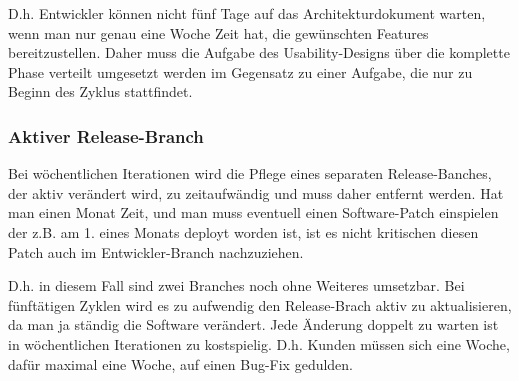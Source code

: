 D.h. Entwickler können nicht fünf Tage auf das Architekturdokument warten,
wenn man nur genau eine Woche Zeit hat, die gewünschten Features
bereitzustellen. Daher muss die Aufgabe des Usability-Designs über die
komplette Phase verteilt umgesetzt werden im Gegensatz zu einer Aufgabe, die
nur zu Beginn des Zyklus stattfindet.

\subsubsection{Aktiver Release-Branch}
Bei wöchentlichen Iterationen wird die Pflege eines separaten Release-Banches,
der aktiv verändert wird, zu zeitaufwändig und muss daher entfernt werden. Hat
man einen Monat Zeit, und man muss eventuell einen Software-Patch einspielen
der z.B. am 1. eines Monats deployt worden ist, ist es nicht kritischen diesen
Patch auch im Entwickler-Branch nachzuziehen.

D.h. in diesem Fall sind zwei Branches noch ohne Weiteres umsetzbar. Bei
fünftätigen Zyklen wird es zu aufwendig den Release-Brach aktiv zu
aktualisieren, da man ja ständig die Software verändert. Jede Änderung doppelt
zu warten ist in wöchentlichen Iterationen zu kostspielig. D.h. Kunden müssen
sich eine Woche, dafür maximal eine Woche, auf einen Bug-Fix gedulden.
